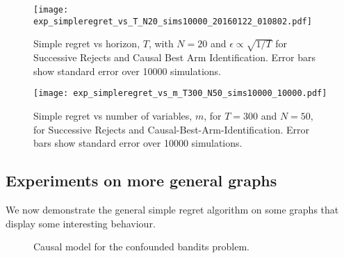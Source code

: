 \begin{figure}
\caption{Simple regret vs horizon, $T$, with $N = 20$ and $\epsilon \propto \sqrt{1/T}$ for Successive Rejects and Causal Best Arm Identification. Error bars show standard error over 10000 simulations.}
\label{fig:simple_vs_T_vary_epsilon}
\centering
\texttt{[image: exp\_simpleregret\_vs\_T\_N20\_sims10000\_20160122\_010802.pdf]}
\end{figure}

\iffalse
\begin{figure}
\caption{Simple regret vs number of variables, $N$, for $T=250$, for Successive Rejects and, Causal-Best-Arm-Identification. Error bars show standard error from 10000 simulations.}
\label{fig:simple_vs_N}
\centering
\texttt{[image: exp\_simpleregret\_vs\_N\_T250\_sims10000\_20160122\_024459.pdf]}
\end{figure}
\fi


\begin{figure}
\caption{Simple regret vs number of variables, $m$, for $T=300$ and $N = 50$, for Successive Rejects and Causal-Best-Arm-Identification. Error bars show standard error over 10000 simulations.}
\label{fig:simple_vs_m}
\centering
\texttt{[image: exp\_simpleregret\_vs\_m\_T300\_N50\_sims10000\_10000.pdf]}
\end{figure}

\iffalse
\begin{figure}
\caption{Simple regret vs number of variables, $N$, for $T=250$, for Successive Rejects and, Causal-Best-Arm-Identification on the confounded bandit problem. Error bars show standard error from 10000 simulations.}
\label{fig:simple_vs_N_confounded}
\centering
\texttt{[image: exp\_general\_simpleregret\_vs\_N\_T250\_sims10000\_20160131\_080208.pdf]}
\end{figure}
\fi

\subsection{Experiments on more general graphs}
We now demonstrate the general simple regret algorithm on some graphs that display some interesting behaviour.
 
\begin{figure}[h]
\centering
\caption{Causal model for the confounded bandits problem.}
\label{fig:causalStructure_confounded_N}
\end{figure}

